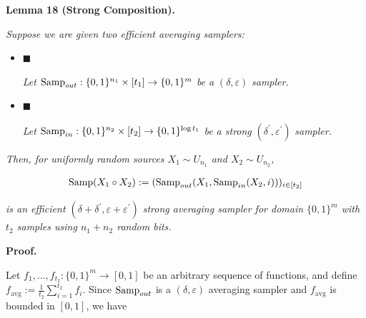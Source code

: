 \par\medskip\noindent\textbf{
\textbf{Lemma 18}\textbf{ }(Strong Composition)\textbf{.}
}\par



\emph{Suppose we are given two efficient averaging samplers:}\par


\begin{itemize}


\item[] 
$\blacksquare$ 


\emph{Let }$\textup{{Samp}}_{out}:\{0,1\}^{n_{1}}\times[t_{1}]\to\{0,1\}^{m}$\emph{ be a }$(\delta,\varepsilon)$\emph{ sampler.}\par





\item[] 
$\blacksquare$ 


\emph{Let }$\textup{{Samp}}_{in}:\{0,1\}^{n_{2}}\times[t_{2}]\to\{0,1\}^{\log t_{1}}$\emph{ be a strong }$(\delta^{\prime},\varepsilon^{\prime})$\emph{ sampler.}\par





\end{itemize}


\emph{Then, for uniformly random sources $X_{1}\sim U_{n_{1}}$ and $X_{2}\sim U_{n_{2}}$,}\par


\[\begin{gathered}
\textup{{Samp}}(X_{1}\circ X_{2}):=(\textup{{Samp}}_{out}(X_{1},\textup{{Samp}}_{in}(X_{2},i)))_{i\in[t_{2}]}
\end{gathered}\]


\emph{is an efficient $(\delta+\delta^{\prime},\varepsilon+\varepsilon^{\prime})$ strong averaging sampler for domain $\{0,1\}^{m}$ with $t_{2}$ samples using $n_{1}+n_{2}$ random bits.}\par






\par\medskip\noindent\textbf{Proof.}\par




Let $f_{1},\dots,f_{t_{2}}:\{0,1\}^{m}\to[0,1]$ be an arbitrary sequence of functions, and define $f_{\text{avg}}:=\frac{1}{t_{2}}\sum_{i=1}^{t_{2}}f_{i}$.
Since $\textup{{Samp}}_{out}$ is a $(\delta,\varepsilon)$ averaging sampler and $f_{\text{avg}}$ is bounded in $[0,1]$, we have\par


